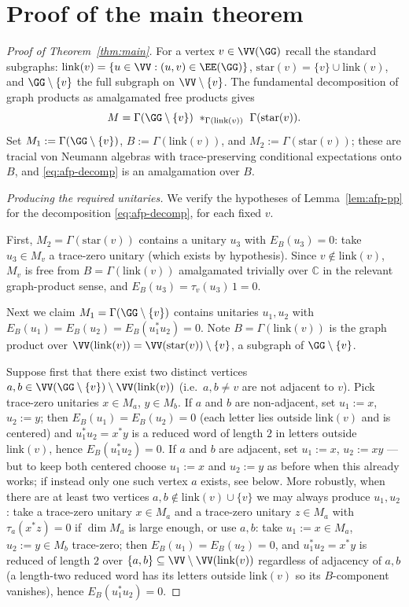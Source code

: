 \section{Proof of the main theorem}

\begin{proof}[Proof of Theorem~\ref{thm:main}]
For a vertex $v\in\VV(\GG)$ recall the standard subgraphs:
$\mathrm{link}(v)=\{u\in\VV : (u,v)\in\EE(\GG)\}$, $\mathrm{star}(v)=\{v\}\cup\mathrm{link}(v)$,
and $\GG\setminus\{v\}$ the full subgraph on $\VV\setminus\{v\}$. The fundamental
decomposition of graph products as amalgamated free products gives
\begin{equation}\label{eq:afp-decomp}
M=\Gamma(\GG\setminus\{v\})\ \ast_{\Gamma(\mathrm{link}(v))}\ \Gamma(\mathrm{star}(v)).
\end{equation}
Set $M_1:=\Gamma(\GG\setminus\{v\})$, $B:=\Gamma(\mathrm{link}(v))$, and
$M_2:=\Gamma(\mathrm{star}(v))$; these are tracial von Neumann algebras with trace-preserving
conditional expectations onto $B$, and \eqref{eq:afp-decomp} is an amalgamation over $B$.

\medskip
\emph{Producing the required unitaries.}
We verify the hypotheses of Lemma~\ref{lem:afp-pp} for the decomposition
\eqref{eq:afp-decomp}, for each fixed $v$.

First, $M_2=\Gamma(\mathrm{star}(v))$ contains a unitary $u_3$ with $E_B(u_3)=0$: take
$u_3\in M_v$ a trace-zero unitary (which exists by hypothesis). Since $v\notin\mathrm{link}(v)$,
$M_v$ is free from $B=\Gamma(\mathrm{link}(v))$ amalgamated trivially over $\mathbb C$ in the
relevant graph-product sense, and $E_B(u_3)=\tau_v(u_3)\,1=0$.

Next we claim $M_1=\Gamma(\GG\setminus\{v\})$ contains unitaries $u_1,u_2$ with
$E_B(u_1)=E_B(u_2)=E_B(u_1^*u_2)=0$. Note $B=\Gamma(\mathrm{link}(v))$ is the graph product
over $\VV(\mathrm{link}(v))=\VV(\mathrm{star}(v))\setminus\{v\}$, a subgraph of
$\GG\setminus\{v\}$.

Suppose first that there exist two distinct vertices $a,b\in\VV(\GG\setminus\{v\})\setminus
\VV(\mathrm{link}(v))$ (i.e.\ $a,b\ne v$ are not adjacent to $v$). Pick trace-zero unitaries
$x\in M_a$, $y\in M_b$. If $a$ and $b$ are non-adjacent, set $u_1:=x$, $u_2:=y$; then
$E_B(u_1)=E_B(u_2)=0$ (each letter lies outside $\mathrm{link}(v)$ and is centered) and
$u_1^*u_2=x^*y$ is a reduced word of length $2$ in letters outside $\mathrm{link}(v)$, hence
$E_B(u_1^*u_2)=0$. If $a$ and $b$ are adjacent, set $u_1:=x$, $u_2:=xy$ — but to keep both
centered choose $u_1:=x$ and $u_2:=y$ as before when this already works; if instead only one
such vertex $a$ exists, see below. More robustly, when there are at least two vertices
$a,b\notin\mathrm{link}(v)\cup\{v\}$ we may always produce $u_1,u_2$: take a trace-zero
unitary $x\in M_a$ and a trace-zero unitary $z\in M_a$ with $\tau_a(x^*z)=0$ if
$\dim M_a$ is large enough, or use $a,b$: take $u_1:=x\in M_a$, $u_2:=y\in M_b$ trace-zero;
then $E_B(u_1)=E_B(u_2)=0$, and $u_1^*u_2=x^*y$ is reduced of length $2$ over
$\{a,b\}\subseteq\VV\setminus\VV(\mathrm{link}(v))$ regardless of adjacency of $a,b$ (a
length-two reduced word has its letters outside $\mathrm{link}(v)$ so its $B$-component
vanishes), hence $E_B(u_1^*u_2)=0$.


\end{proof}

